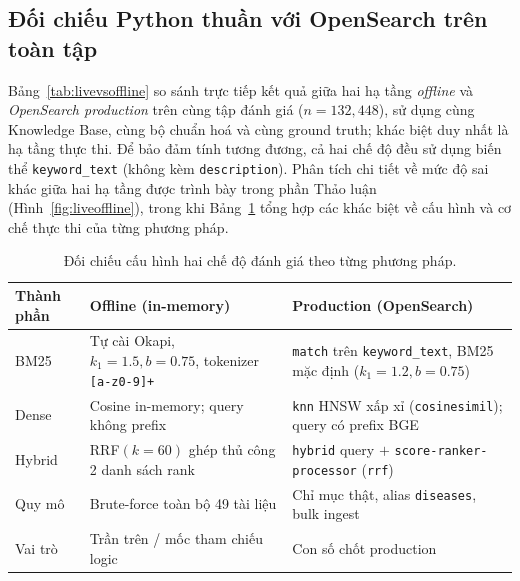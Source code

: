 \subsection{Đối chiếu Python thuần với OpenSearch trên toàn tập}
Bảng~\ref{tab:livevsoffline} so sánh trực tiếp kết quả giữa hai hạ tầng \emph{offline} và \emph{OpenSearch production} trên cùng tập đánh giá ($n=132{,}448$), sử dụng cùng Knowledge Base, cùng bộ chuẩn hoá và cùng ground truth; khác biệt duy nhất là hạ tầng thực thi. Để bảo đảm tính tương đương, cả hai chế độ đều sử dụng biến thể \texttt{keyword\_text} (không kèm \texttt{description}). Phân tích chi tiết về mức độ sai khác giữa hai hạ tầng được trình bày trong phần Thảo luận (Hình~\ref{fig:liveoffline}), trong khi Bảng~\ref{tab:harness} tổng hợp các khác biệt về cấu hình và cơ chế thực thi của từng phương pháp.

\begin{table}[H]
  \centering
  \small
  \caption{Đối chiếu cấu hình hai chế độ đánh giá theo từng phương pháp.}
  \label{tab:harness}
  \begin{tabular}{p{2.3cm}p{5.4cm}p{5.4cm}}
    \toprule
    \textbf{Thành phần} & \textbf{Offline (in-memory)}                                     & \textbf{Production (OpenSearch)}                                                 \\
    \midrule
    BM25                & Tự cài Okapi, $k_1{=}1.5,b{=}0.75$, tokenizer \texttt{[a-z0-9]+} & \texttt{match} trên \texttt{keyword\_text}, BM25 mặc định ($k_1{=}1.2,b{=}0.75$) \\
    Dense               & Cosine in-memory; query không prefix                             & \texttt{knn} HNSW xấp xỉ (\texttt{cosinesimil}); query có prefix BGE             \\
    Hybrid              & RRF$(k{=}60)$ ghép thủ công 2 danh sách rank                     & \texttt{hybrid} query $+$ \texttt{score-ranker-processor} (\texttt{rrf})         \\
    Quy mô              & Brute-force toàn bộ 49 tài liệu                                  & Chỉ mục thật, alias \texttt{diseases}, bulk ingest                               \\
    Vai trò             & Trần trên / mốc tham chiếu logic                                 & Con số chốt production                                                           \\
    \bottomrule
  \end{tabular}
\end{table}

